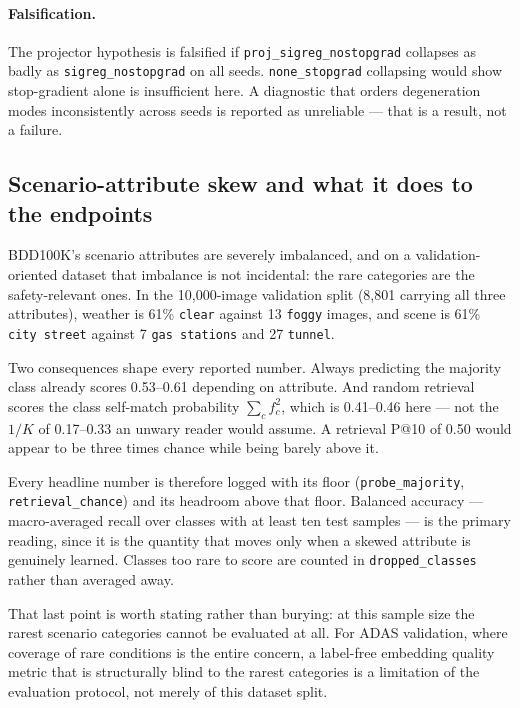 \paragraph{Falsification.} The projector hypothesis is falsified if
\texttt{proj\_sigreg\_nostopgrad} collapses as badly as \texttt{sigreg\_nostopgrad} on all
seeds. \texttt{none\_stopgrad} collapsing would show stop-gradient alone is insufficient
here. A diagnostic that orders degeneration modes inconsistently across seeds is reported
as unreliable — that is a result, not a failure.

\subsection{Scenario-attribute skew and what it does to the endpoints}

BDD100K's scenario attributes are severely imbalanced, and on a validation-oriented dataset
that imbalance is not incidental: the rare categories are the safety-relevant ones. In the
10{,}000-image validation split (8{,}801 carrying all three attributes), weather is 61\%
\texttt{clear} against 13 \texttt{foggy} images, and scene is 61\% \texttt{city street}
against 7 \texttt{gas stations} and 27 \texttt{tunnel}.

Two consequences shape every reported number. \established{} Always predicting the majority
class already scores 0.53--0.61 depending on attribute. And random retrieval scores the
class self-match probability $\sum_c f_c^2$, which is 0.41--0.46 here --- not the $1/K$ of
0.17--0.33 an unwary reader would assume. A retrieval P@10 of 0.50 would appear to be three
times chance while being barely above it.

Every headline number is therefore logged with its floor (\texttt{probe\_majority},
\texttt{retrieval\_chance}) and its headroom above that floor. Balanced accuracy ---
macro-averaged recall over classes with at least ten test samples --- is the primary
reading, since it is the quantity that moves only when a skewed attribute is genuinely
learned. Classes too rare to score are counted in \texttt{dropped\_classes} rather than
averaged away.

\ours{} That last point is worth stating rather than burying: at this sample size the
rarest scenario categories cannot be evaluated at all. For ADAS validation, where coverage
of rare conditions is the entire concern, a label-free embedding quality metric that is
structurally blind to the rarest categories is a limitation of the evaluation protocol, not
merely of this dataset split.
